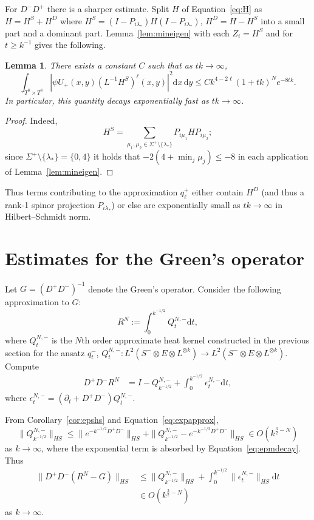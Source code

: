 \documentclass{article}
\newcommand{\di}{\mathrm{d}}
\newcommand{\inv}{^{-1}}
\newcommand{\Spectrum}{\Sigma}
\newtheorem{lemma}[theorem]{Lemma}
\theoremstyle{definition}
\theoremstyle{remark}
\begin{document}
For $D^- D^+$ there is a sharper estimate.
Split $H$ of Equation~\eqref{eq:H} as $H = H^S + H^D$ where $H^S = (I-P_{i\lambda_*})H(I-P_{i\lambda_*})$, $H^D = H - H^S$ into a small part and a dominant part.
Lemma~\ref{lem:mineigen} with each $Z_i = H^S$ and for $t \ge k\inv$ gives the following.
\begin{lemma}
    \label{lem:expsmall}
    There exists a constant $C$ such that as $tk \to \infty$,
\begin{equation}
    \label{eq:small}
    \int_{T^8 \times T^8} |\psi U_+(x,y) (L\inv H^S)^\ell(x,y)|^2\di x\, \di y \le Ck^{4-2\ell} (1 + tk)^N e^{-8tk}.
\end{equation}
In particular, this quantity decays exponentially fast as $tk \to \infty$.
\end{lemma}
\begin{proof}
Indeed,
\[
    H^S = \sum_{\mu_1, \mu_2 \in \Spectrum^+ \setminus \{\lambda_*\}} P_{i\mu_1} H P_{i\mu_2};
\]
since $\Spectrum^+ \setminus \{\lambda_*\} = \{0,4\}$ it holds that $-2(4 + \min_j \mu_j) \le -8$ in each application of Lemma~\ref{lem:mineigen}.
\end{proof}

Thus terms contributing to the approximation $q^+_\ell$ either contain $H^D$ (and thus a rank-1 spinor projection $P_{i\lambda_*}$) or else are exponentially small as $tk \to \infty$ in Hilbert--Schmidt norm.

\section{Estimates for the Green's operator}
\label{sec:mellin}

Let $G = (D^+ D^-)\inv$ denote the Green's operator.
Consider the following approximation to $G$:
\[
    R^N := \int_0^{k^{-1/2}} Q^{N,-}_t \di t,
\]
where $Q^{N,-}_t$ is the $N$th order approximate heat kernel constructed in the previous section for the ansatz $q^-_t$, $Q^{N,-}_t \colon L^2(S^- \otimes E \otimes L^{\otimes k}) \to L^2(S^- \otimes E \otimes L^{\otimes k})$.
Compute
\begin{align*}
    D^+ D^- R^N &= I - Q^{N,-}_{k^{-1/2}} + \int_0^{k^{-1/2}} \epsilon^{N,-}_t \di t,
\end{align*}
where $\epsilon^{N,-}_t = (\partial_t + D^+D^-)Q^{N,-}_t$.

From Corollary~\ref{cor:epshs} and Equation~\eqref{eq:expapprox},
\[
    \| Q^{N,-}_{k^{-1/2}}\|_{HS} \le \| e^{-k^{-1/2} D^+ D^-} \|_{HS} + \|Q_{k^{-1/2}}^{N,-} - e^{-k^{-1/2} D^+ D^-}\|_{HS} \in O(k^{\frac{3}{2} - N})
\]
as $k \to \infty$, where the exponential term is absorbed by Equation~\eqref{eq:epmdecay}.
Thus
\begin{align*}
    \| D^+ D^-(R^N - G) \|_{HS} &\le \| Q^{N,-}_{k^{-1/2}}\|_{HS} + \int_0^{k^{-1/2}} \|\epsilon^{N,-}_t\|_{HS} \di t \\
                                &\in O(k^{\frac{3}{2} - N})
\end{align*}
as $k \to \infty$.
\end{document}
